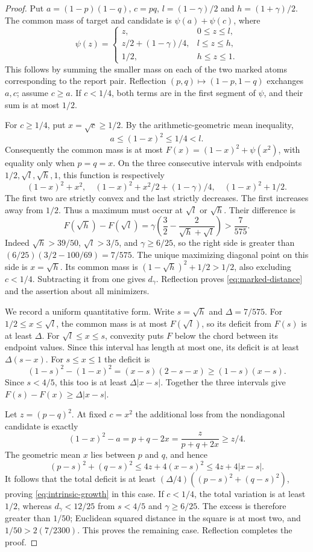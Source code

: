 \begin{proof}
Put $a=(1-p)(1-q)$, $c=pq$, $l=(1-\gamma)/2$ and
$h=(1+\gamma)/2$. The common mass of target and candidate is
$\psi(a)+\psi(c)$, where
\[
 \psi(z)=
 \begin{cases}
 z,&0\le z\le l,\\
 z/2+(1-\gamma)/4,&l\le z\le h,\\
 1/2,&h\le z\le1.
 \end{cases}
\]
This follows by summing the smaller mass on each of the two marked
atoms corresponding to the report pair. Reflection
$(p,q)\mapsto(1-p,1-q)$ exchanges $a,c$; assume $c\ge a$.
If $c<1/4$, both terms are in the first segment of $\psi$, and their
sum is at most $1/2$.

For $c\ge1/4$, put $x=\sqrt c\ge1/2$. By the arithmetic-geometric
mean inequality,
\[
 a\le(1-x)^2\le1/4<l.
\]
Consequently the common mass is at most
$F(x)=(1-x)^2+\psi(x^2)$, with equality only when $p=q=x$.
On the three consecutive intervals with endpoints
$1/2,\sqrt l,\sqrt h,1$, this function is respectively
\[
 (1-x)^2+x^2,\quad
 (1-x)^2+x^2/2+(1-\gamma)/4,\quad
 (1-x)^2+1/2.
\]
The first two are strictly convex and the last strictly decreases.
The first increases away from $1/2$. Thus a maximum must occur at
$\sqrt l$ or $\sqrt h$. Their difference is
\begin{equation}\label{eq:overlap-endpoints}
 F(\sqrt h)-F(\sqrt l)
 =\gamma\left(\frac32-\frac2{\sqrt h+\sqrt l}\right)>\frac7{575}.
\end{equation}
Indeed $\sqrt h>39/50$, $\sqrt l>3/5$, and $\gamma\ge6/25$,
so the right side is greater than
$(6/25)(3/2-100/69)=7/575$.
The unique maximizing diagonal point on this side is $x=\sqrt h$.
Its common mass is $(1-\sqrt h)^2+1/2>1/2$, also excluding $c<1/4$.
Subtracting it from one gives $d_\gamma$. Reflection proves
\eqref{eq:marked-distance} and the assertion about all minimizers.

We record a uniform quantitative form. Write $s=\sqrt h$ and
$\Delta=7/575$. For $1/2\le x\le\sqrt l$, the common mass is at
most $F(\sqrt l)$, so its deficit from $F(s)$ is at least $\Delta$.
For $\sqrt l\le x\le s$, convexity puts $F$ below the chord between
its endpoint values. Since this interval has length at most one, its
deficit is at least $\Delta(s-x)$. For $s\le x\le1$ the deficit is
\[
 (1-s)^2-(1-x)^2=(x-s)(2-s-x)\ge(1-s)(x-s).
\]
Since $s<4/5$, this too is at least $\Delta|x-s|$.
Together the three intervals give $F(s)-F(x)\ge\Delta|x-s|$.

Let $z=(p-q)^2$. At fixed $c=x^2$ the additional loss from the
nondiagonal candidate is exactly
\[
 (1-x)^2-a=p+q-2x=\frac{z}{p+q+2x}\ge z/4.
\]
The geometric mean $x$ lies between $p$ and $q$, and hence
\[
 (p-s)^2+(q-s)^2\le4z+4(x-s)^2\le4z+4|x-s|.
\]
It follows that the total deficit is at least
$(\Delta/4)((p-s)^2+(q-s)^2)$, proving
\eqref{eq:intrinsic-growth} in this case. If $c<1/4$, the total variation is
at least $1/2$, whereas $d_\gamma<12/25$ from $s<4/5$ and
$\gamma\ge6/25$. The excess is therefore greater than $1/50$;
Euclidean squared distance in the square is at most two, and
$1/50>2(7/2300)$. This proves the remaining case. Reflection completes
the proof.
\end{proof}

